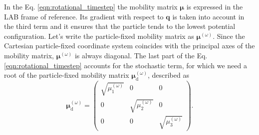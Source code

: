 \documentclass{master_thesis}
\begin{document}
In the Eq. \eqref{eqn:rotational_timestep} the mobility matrix $\bm{\mu}$ is expressed in the LAB frame of reference. Its gradient with respect to $\boldsymbol{q}$ is taken into account in the third term and it ensures that the particle tends to the lowest potential configuration. Let's write the particle-fixed mobility matrix as $\bm{\mu}^{(\omega)}$. Since the Cartesian particle-fixed coordinate system coincides with the principal axes of the mobility matrix, $\bm{\mu}^{(\omega)}$ is always diagonal. The last part of the Eq. \eqref{eqn:rotational_timestep} accounts for the stochastic term, for which we need a root of the particle-fixed mobility matrix $\bm{\mu}^{(\omega)}_{\textrm{d}}$, described as
\begin{equation}
    \bm{\mu}^{(\omega)}_{\textrm{d}}=
    \begin{pmatrix}
    \sqrt{\mu^{(\omega)}_1} & 0 & 0\\
    0 & \sqrt{\mu^{(\omega)}_2} & 0\\
    0 & 0 & \sqrt{\mu^{(\omega)}_3}
    \end{pmatrix}.
\end{equation}
\end{document}
